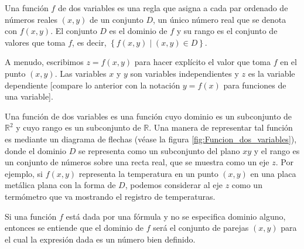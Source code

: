 \begin{definition}
    Una función $f$ de dos variables es una regla que asigna a cada par ordenado de números reales $(x, y)$ de un conjunto $D$, un único número real que se denota con $f(x, y)$. El conjunto $D$ es el dominio de $f$ y su rango es el conjunto de valores que toma $f$, es decir, $\left\{ f(x, y) \mid (x, y) \in D \right\}$.
\end{definition}

A menudo, escribimos $z = f(x, y)$ para hacer explícito el valor que toma $f$ en el punto $(x, y)$. Las variables $x$ y $y$ son variables independientes y $z$ es la variable dependiente [compare lo anterior con la notación $y = f(x)$ para funciones de una variable].

Una función de dos variables es una función cuyo dominio es un subconjunto de $\mathbb{R}^2$ y cuyo rango es un subconjunto de $\mathbb{R}$. Una manera de representar tal función es mediante un diagrama de flechas (véase la figura \ref{fig:Funcion_dos_variables}), donde el dominio $D$ se representa como un subconjunto del plano $x y$ y el rango es un conjunto de números sobre una recta real, que se muestra como un eje $z$. Por ejemplo, si $f(x, y)$ representa la temperatura en un punto $(x, y)$ en una placa metálica plana con la forma de $D$, podemos considerar al eje $z$ como un termómetro que va mostrando el registro de temperaturas.

Si una función $f$ está dada por una fórmula y no se especifica dominio alguno, entonces se entiende que el dominio de $f$ será el conjunto de parejas $(x, y)$ para el cual la expresión dada es un número bien definido.

